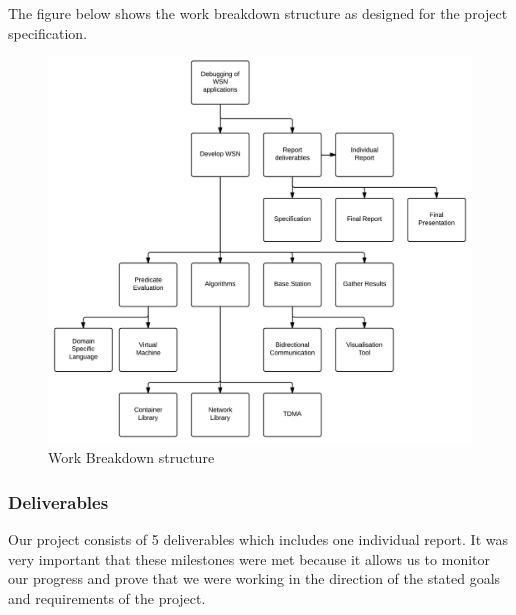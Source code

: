The figure below shows the work breakdown structure as designed for the project specification.

\begin{figure}[H]
\centering
\includegraphics[width=\linewidth]{Images/pm-wbs.pdf}
\caption{Work Breakdown structure}
\label{fig:Work Breakdown Structure}
\end{figure}

\subsubsection{Deliverables}

Our project consists of 5 deliverables which includes one individual report. It was very important that these milestones were met because it allows us to monitor our progress and prove that we were working in the direction of the stated goals and requirements of the project.

